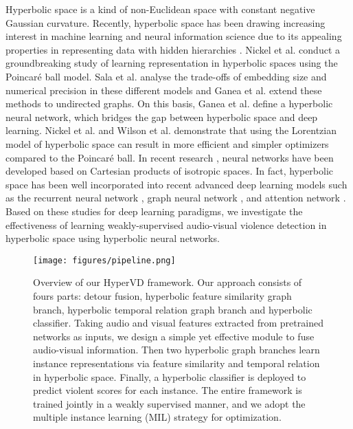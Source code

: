\documentclass[sigconf]{acmart}
\begin{document}
Hyperbolic space is a kind of non-Euclidean space with constant negative Gaussian curvature. Recently, hyperbolic space has been drawing increasing interest in machine learning and neural information science due to its appealing properties in representing data with hidden hierarchies \cite{Nickel2017PoincarEF, Sala2018RepresentationTF, Nickel2018LearningCH, Wang2019HyperbolicHI}. Nickel et al. \cite{Nickel2017PoincarEF} conduct a groundbreaking study of learning representation in hyperbolic spaces using the Poincar{\'e} ball model. Sala et al. \cite{Sala2018RepresentationTF} analyse the trade-offs of embedding size and numerical precision in these different models and Ganea et al. \cite{Ganea2018HyperbolicEC} extend these methods to undirected graphs. On this basis, Ganea et al. \cite{Ganea2018HyperbolicNN} define a hyperbolic neural network, which bridges the gap between hyperbolic space and deep learning. Nickel et al. \cite{Nickel2018LearningCH} and Wilson et al. \cite{Wilson2018GradientDI} demonstrate that using the Lorentzian model of hyperbolic space can result in more efficient and simpler optimizers compared to the Poincaré ball. In recent research \cite{gu2019learning}, neural networks have been developed based on Cartesian products of isotropic spaces. In fact, hyperbolic space has been well incorporated into recent advanced deep learning models such as the recurrent neural network \cite{Ganea2018HyperbolicNN}, graph neural network \cite{Liu2019HyperbolicGN}, and attention network \cite{Glehre2019HyperbolicAN}. Based on these studies for deep learning paradigms, we investigate the effectiveness of learning weakly-supervised audio-visual violence detection in hyperbolic space using hyperbolic neural networks.



\begin{figure*}[t]
    \centering
\texttt{[image: figures/pipeline.png]} \caption{Overview of our HyperVD framework. Our approach consists of fours parts: detour fusion, hyperbolic feature similarity graph branch, hyperbolic temporal relation graph branch and hyperbolic classifier. Taking audio and visual features extracted from pretrained networks as inputs, we design a simple yet effective module to fuse audio-visual information. Then two hyperbolic graph branches learn instance representations via feature similarity and temporal relation in hyperbolic space. Finally, a hyperbolic classifier is deployed to predict violent scores for each instance. The entire framework is trained jointly in a weakly supervised manner, and we adopt the multiple instance learning (MIL) strategy for optimization.}
    \label{fig2}
\end{figure*}
\end{document}
